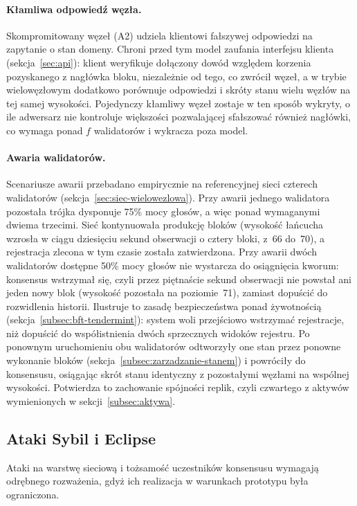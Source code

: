 \paragraph{Kłamliwa odpowiedź węzła.} Skompromitowany węzeł (A2) udziela klientowi fałszywej odpowiedzi na zapytanie o stan domeny. Chroni przed tym model zaufania interfejsu klienta (sekcja~\ref{sec:api}): klient weryfikuje dołączony dowód względem korzenia pozyskanego z nagłówka bloku, niezależnie od tego, co zwrócił węzeł, a w trybie wielowęzłowym dodatkowo porównuje odpowiedzi i skróty stanu wielu węzłów na tej samej wysokości. Pojedynczy kłamliwy węzeł zostaje w ten sposób wykryty, o ile adwersarz nie kontroluje większości pozwalającej sfałszować również nagłówki, co wymaga ponad $f$ walidatorów i wykracza poza model.

\paragraph{Awaria walidatorów.} Scenariusze awarii przebadano empirycznie na referencyjnej sieci czterech walidatorów (sekcja~\ref{sec:siec-wielowezlowa}). Przy awarii jednego walidatora pozostała trójka dysponuje 75\% mocy głosów, a więc ponad wymaganymi dwiema trzecimi. Sieć kontynuowała produkcję bloków (wysokość łańcucha wzrosła w ciągu dziesięciu sekund obserwacji o cztery bloki, z~66 do~70), a rejestracja zlecona w tym czasie została zatwierdzona. Przy awarii dwóch walidatorów dostępne 50\% mocy głosów nie wystarcza do osiągnięcia kworum: konsensus wstrzymał się, czyli przez piętnaście sekund obserwacji nie powstał ani jeden nowy blok (wysokość pozostała na poziomie~71), zamiast dopuścić do rozwidlenia historii. Ilustruje to zasadę bezpieczeństwa ponad żywotnością (sekcja~\ref{subsec:bft-tendermint}): system woli przejściowo wstrzymać rejestracje, niż dopuścić do współistnienia dwóch sprzecznych widoków rejestru. Po ponownym uruchomieniu obu walidatorów odtworzyły one stan przez ponowne wykonanie bloków (sekcja~\ref{subsec:zarzadzanie-stanem}) i powróciły do konsensusu, osiągając skrót stanu identyczny z pozostałymi węzłami na wspólnej wysokości. Potwierdza to zachowanie spójności replik, czyli czwartego z aktywów wymienionych w sekcji~\ref{subsec:aktywa}.

\subsection{Ataki Sybil i Eclipse}
\label{subsec:sybil-eclipse}

Ataki na warstwę sieciową i tożsamość uczestników konsensusu wymagają odrębnego rozważenia, gdyż ich realizacja w warunkach prototypu była ograniczona.

